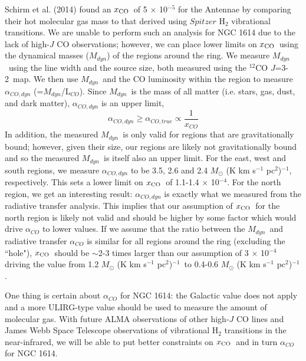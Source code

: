 \documentclass[preprint, 11pt]{aastex}
\newcommand{\cothree}{$^{12}$CO $J$=3-2}
\newcommand{\mdyn}{$M_{dyn}$}
\newcommand{\alphaco}{$M_{\odot}$ (K km s$^{-1}$ pc$^{2}$)$^{-1}$}
\newcommand{\xh}{$x_{\rm{CO}}$}
\begin{document}
Schirm et al. (2014)\nocite{Schirm2014} found an \xh\ of 5 $\times$ 10$^{-5}$ for the Antennae by comparing their hot molecular gas mass to that derived using $Spitzer$ H$_{2}$ vibrational transitions. We are unable to perform such an analysis for NGC 1614 due to the lack of high-$J$ CO observations; however, we can place lower limits on \xh\ using the dynamical masses (\mdyn) of the regions around the ring. We measure \mdyn\ using the line width and the source size, both measured using the \cothree\ map. We then use \mdyn\ and the CO luminosity within the region to measure $\alpha_{CO, dyn}$ (=\mdyn/L$_{CO}$). Since \mdyn\ is the mass of all matter (i.e. stars, gas, dust, and dark matter), $\alpha_{CO, dyn}$ is an upper limit,
\begin{equation}
\alpha_{CO, dyn} \geq \alpha_{CO, true} \propto \frac{1}{x_{CO}}
\end{equation}
In addition, the measured \mdyn\ is only valid for regions that are gravitationally bound; however, given their size, our regions are likely not gravitationally bound and so the measured \mdyn\ is itself also an upper limit. For the east, west and south regions, we measure $\alpha_{CO,dyn}$ to be 3.5, 2.6 and 2.4 \alphaco, respectively. This sets a lower limit on \xh\ of 1.1-1.4 $\times$ 10$^{-4}$. For the north region, we get an interesting result: $\alpha_{CO, dyn}$ is exactly what we measured from the radiative transfer analysis. This implies that our assumption of \xh\ for the north region is likely not valid and should be higher by some factor which would drive $\alpha_{CO}$ to lower values. If we assume that the ratio between the \mdyn\ and radiative transfer $\alpha_{CO}$  is similar for all regions around the ring (excluding the ``hole"), \xh\ should be $\sim$2-3 times larger than our assumption of 3 $\times$ 10$^{-4}$ driving the value from 1.2 \alphaco\ to 0.4-0.6 \alphaco. 


One thing is certain about $\alpha_{CO}$ for NGC 1614: the Galactic value does not apply and a more ULIRG-type value should be used to measure the amount of molecular gas. With future ALMA observations of other high-$J$ CO lines and James Webb Space Telescope observations of vibrational H$_{2}$ transitions in the near-infrared, we will be able to put better constraints on \xh\ and in turn $\alpha_{CO}$ for NGC 1614.  
\end{document}
